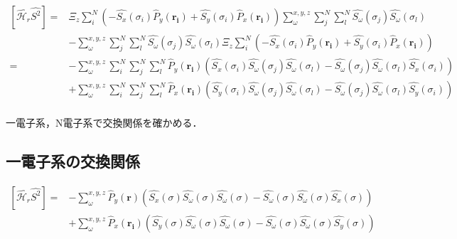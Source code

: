 \documentclass{article}
\begin{document}
\begin{equation}
\begin{split}
\label{manko}
[\hat{\mathcal{H}_r} \hat{S^2} ] =& \Xi_z  \sum_{i}^{N}\left( -{\hat{S_x}}(\sigma_i) {\hat{P}_y}{(\boldsymbol{r_i})} + {\hat{S_y}}(\sigma_i) {\hat{P}_x}{(\boldsymbol{r_i})} \right) \sum_{\omega}^{x,y,z}\sum_{j}^{N}\sum_{l}^{N} \hat{S_{\omega}}{(\sigma_j)} \hat{S_{\omega}}{(\sigma_l)}\\
&- \sum_{\omega}^{x,y,z}\sum_{j}^{N}\sum_{l}^{N} \hat{S_{\omega}}{(\sigma_j)} \hat{S_{\omega}}{(\sigma_l)} \Xi_z  \sum_{i}^{N}\left( -{\hat{S_x}}(\sigma_i) {\hat{P}_y}{(\boldsymbol{r_i})} + {\hat{S_y}}(\sigma_i) {\hat{P}_x}{(\boldsymbol{r_i})} \right)\\
=& - \sum_{\omega}^{x,y,z} \sum_{i}^{N}  \sum_{j}^{N} \sum_{l}^{N}  {\hat{P}_y}{(\boldsymbol{r_i})} \left( {\hat{S_x}}(\sigma_i) \hat{S_{\omega}}{(\sigma_j)} \hat{S_{\omega}}{(\sigma_l)} -  \hat{S_{\omega}}{(\sigma_j)} \hat{S_{\omega}}{(\sigma_l)} {\hat{S_x}}(\sigma_i)\right)\\
&+ \sum_{\omega}^{x,y,z} \sum_{i}^{N} \sum_{j}^{N} \sum_{l}^{N}  {\hat{P}_x}{(\boldsymbol{r_i})}  \left( {\hat{S_y}}(\sigma_i) \hat{S_{\omega}}{(\sigma_j)} \hat{S_{\omega}}{(\sigma_l)} - \hat{S_{\omega}}{(\sigma_j)} \hat{S_{\omega}}{(\sigma_l)  {\hat{S_y}}(\sigma_i)}\right)\\
\end{split}
\end{equation}

一電子系，N電子系で交換関係を確かめる．
\subsection{一電子系の交換関係}
\begin{equation}
\begin{split}
\label{ichidensi}
[\hat{\mathcal{H}_r} \hat{S^2} ] =&- \sum_{\omega}^{x,y,z} {\hat{P}_y}{(\boldsymbol{r})} \left( {\hat{S_x}}(\sigma) \hat{S_{\omega}}{(\sigma)} \hat{S_{\omega}}{(\sigma)} -  \hat{S_{\omega}}{(\sigma)} \hat{S_{\omega}}{(\sigma)} {\hat{S_x}}(\sigma)\right)\\
&+ \sum_{\omega}^{x,y,z}  {\hat{P}_x}{(\boldsymbol{r_i})}  \left( {\hat{S_y}}(\sigma) \hat{S_{\omega}}{(\sigma)} \hat{S_{\omega}}{(\sigma)} - \hat{S_{\omega}}{(\sigma)} \hat{S_{\omega}}{(\sigma)  {\hat{S_y}}(\sigma)}\right)\\
\end{split}
\end{equation}
\end{document}
